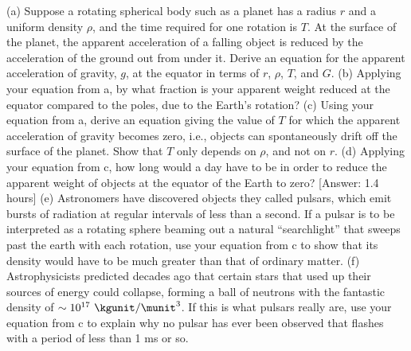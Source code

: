  (a) Suppose a rotating spherical body such as a planet
has a radius $r$ and a uniform density $\rho $, and the time
required for one rotation is $T$. At the surface of the
planet, the apparent acceleration of a falling object is
reduced by the acceleration of the ground out from under it.
Derive an equation for the apparent acceleration of gravity,
$g$, at the equator in terms of $r$, $\rho$, $T$, and $G$.\answercheck\hwendpart
(b) Applying your equation from a, by what fraction is
your apparent weight reduced at the equator compared to the
poles, due to the Earth's rotation?\answercheck\hwendpart
(c) Using your equation from a, derive an equation giving
the value of $T$ for which the apparent acceleration of
gravity becomes zero, i.e., objects can spontaneously drift
off the surface of the planet. Show that $T$ only depends on
$\rho $, and not on $r$.\answercheck\hwendpart
(d) Applying your equation from c, how long would a day
have to be in order to reduce the apparent weight of objects
at the equator of the Earth to zero? [Answer: 1.4 hours]\hwendpart
(e) Astronomers have discovered objects
they called pulsars, which emit bursts of radiation at
regular intervals of less than a second. If a pulsar is to
be interpreted as a rotating sphere beaming out a natural
``searchlight'' that sweeps past the earth with each
rotation, use your equation from c to show that its
density would have to be much greater than that of ordinary matter.\hwendpart
(f) Astrophysicists predicted decades ago that
certain stars that used up their sources of energy could
collapse, forming a ball of neutrons with the fantastic
density of $\sim10^{17}\ \kgunit/\munit^3$. If this is what pulsars
really are, use your equation from c to explain why no
pulsar has ever been observed that flashes with a period of
less than 1 ms or so.
